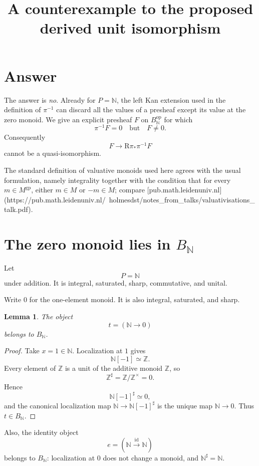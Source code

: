 \documentclass[11pt]{article}
\newtheorem{lemma}[theorem]{Lemma}
\theoremstyle{definition}
\theoremstyle{remark}
\newcommand{\op}{{\mathrm{op}}}
\newcommand{\id}{\mathrm{id}}
\newcommand{\N}{\mathbb N}
\newcommand{\Z}{\mathbb Z}
\begin{document}
\title{A counterexample to the proposed derived unit isomorphism}
\author{}
\date{}
\maketitle

\section*{Answer}

The answer is \emph{no}.  Already for \(P=\N\), the left Kan
extension used in the definition of \(\pi^{-1}\) can discard all the
values of a presheaf except its value at the zero monoid.  We give an
explicit presheaf \(F\) on \(B_{\N}^{\op}\) for which
\[
\pi^{-1}F=0
\quad\text{but}\quad F\neq 0.
\]
Consequently
\[
F\longrightarrow \mathrm R\pi_{\ast}\pi^{-1}F
\]
cannot be a quasi-isomorphism.

The standard definition of valuative monoids used here agrees with the
usual formulation, namely integrality together with the condition that
for every \(m\in M^{\mathrm{gp}}\), either \(m\in M\) or \(-m\in M\);
compare
[pub.math.leidenuniv.nl](https://pub.math.leidenuniv.nl/~holmesdst/notes_from_talks/valuativisations_talk.pdf).

\section{The zero monoid lies in \(B_{\N}\)}

Let
\[
P=\N
\]
under addition.  It is integral, saturated, sharp, commutative, and
unital.

Write \(0\) for the one-element monoid.  It is also integral,
saturated, and sharp.

\begin{lemma}\label{lem:zero-in-B}
The object
\[
t=(\N\longrightarrow 0)
\]
belongs to \(B_{\N}\).
\end{lemma}

\begin{proof}
Take \(x=1\in\N\).  Localization at \(1\) gives
\[
\N[-1]\simeq \Z.
\]
Every element of \(\Z\) is a unit of the additive monoid \(\Z\), so
\[
\Z^\sharp=\Z/\Z^\times=0.
\]
Hence
\[
\N[-1]^\sharp\simeq 0,
\]
and the canonical localization map \(\N\to\N[-1]^\sharp\) is the
unique map \(\N\to0\).  Thus \(t\in B_{\N}\).
\end{proof}

Also, the identity object
\[
e=(\N\xrightarrow{\id}\N)
\]
belongs to \(B_{\N}\): localization at \(0\) does not change a monoid,
and \(\N^\sharp=\N\).
\end{document}

